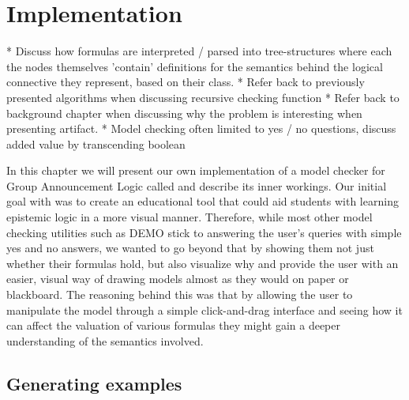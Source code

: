 \section{Implementation}\label{sec:impl}

* Discuss how formulas are interpreted / parsed into tree-structures where each the nodes themselves 'contain' definitions for the semantics behind the logical connective they represent, based on their class.
* Refer back to previously presented algorithms when discussing recursive checking function
* Refer back to background chapter when discussing why the problem is interesting when presenting artifact.
* Model checking often limited to yes / no questions, discuss added value by transcending boolean 



In this chapter we will present our own implementation of a model checker for Group Announcement Logic called \cname and describe its inner workings. Our initial goal with \cname was to create an educational tool that could aid students with learning epistemic logic in a more visual manner. Therefore, while most other model checking utilities such as DEMO \cite{JanvanEijck} stick to answering the user's queries with simple yes and no answers, we wanted to go beyond that by showing them not just whether their formulas hold, but also visualize why and provide the user with an easier, visual way of drawing models almost as they would on paper or blackboard. The reasoning behind this was that by allowing the user to manipulate the model through a simple click-and-drag interface and seeing how it can affect the valuation of various formulas they might gain a deeper understanding of the semantics involved.


\subsection{Generating examples}

